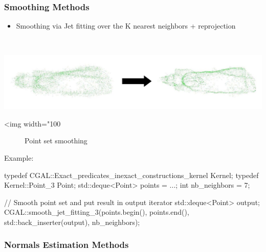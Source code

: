 \subsubsection{Smoothing Methods}

\begin{itemize}
\item Smoothing via Jet fitting over the K nearest neighbors + reprojection
\end{itemize}

  \\

\begin{center}
    \label{Surface_reconstruction_3-fig-smoothing_jet_fitting}
    \begin{ccTexOnly}
        \includegraphics[width=1.0\textwidth]{Surface_reconstruction_3/smoothing_jet_fitting} %
    \end{ccTexOnly}
    \begin{ccHtmlOnly}
        <img width="100%
    \end{ccHtmlOnly}
    \begin{figure}[h]
        \caption{Point set smoothing}
    \end{figure}
\end{center}

Example:

\begin{ccExampleCode}
typedef CGAL::Exact_predicates_inexact_constructions_kernel Kernel;
typedef Kernel::Point_3 Point;
std::deque<Point> points = ...;
int nb_neighbors = 7;

// Smooth point set and put result in output iterator
std::deque<Point> output;
CGAL::smooth_jet_fitting_3(points.begin(), points.end(),
                           std::back_inserter(output),
                           nb_neighbors);
\end{ccExampleCode}


\subsubsection{Normals Estimation Methods}


